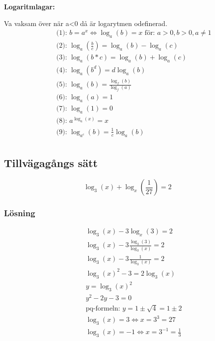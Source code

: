 \begin{multicols}{2}
\textbf{Logaritmlagar:}\par
Va vaksam över när a<0 då är logarytmen odefinerad. 
\begin{align*}
  &\quad \text{(1): } b = a^x \Leftrightarrow \log_a(b) = x  \text{ för: } a>0, b>0, a \ne 1  \\
  &\quad \text{(2): } \log_a(\frac{b}{c}) = \log_a(b) - \log_a(c) \\
  &\quad \text{(3): } \log_a(b*c) = \log_a(b) + \log_a(c) \\
  &\quad \text{(4): } \log_a(b^d) = d\log_a(b) \\
  &\quad \text{(5): } \log_a(b) = \frac{\log_f(b)}{\log_f(a)} \\
  &\quad \text{(6): } \log_a(a) = 1 \\
  &\quad \text{(7): } \log_a(1) = 0 \\
  &\quad \text{(8): } a^{\log_a(x)} = x \\
  &\quad \text{(9): } \log_{a^c}(b) = \frac{1}{c} \log_a(b) \\
\end{align*}

\subsection{Tillvägagångs sätt}
\begin{equation}
\log_3(x) + \log_x(\frac{1}{27}) = 2
\end{equation}

\subsubsection{Lösning}
\begin{align*}
  &\quad \log_3(x) - 3 \log_x(3) = 2 \\
  &\quad  \log_3(x) - 3 \frac{\log_3(3)}{\log_3(x)} = 2 \\
  &\quad  \log_3(x) - 3 \frac{1}{\log_3(x)} = 2 \\
  &\quad  \log_3(x)^2 - 3 = 2 \log_3(x) \\
  &\quad  y = \log_3(x)^{2} \\
  &\quad  y^2 - 2y- 3 = 0 \\
  &\quad  \text{pq-formeln: } y= 1 \pm \sqrt{4} = 1 \pm 2 \\
  &\quad  \log_3(x) = 3 \Leftrightarrow x = 3^3 = 27 \\
  &\quad  \log_3(x) = -1 \Leftrightarrow x = 3^{-1} = \frac{1}{3} \\
\end{align*}



\end{multicols}
